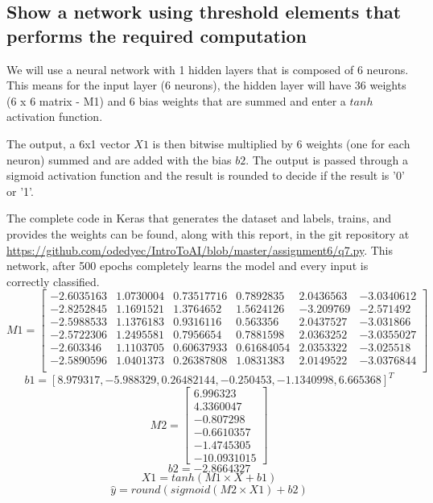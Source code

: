 \documentclass{article}                     %
\begin{document}
	\subsection{Show a network using threshold elements that performs the required computation}
	We will use a neural network with 1 hidden layers that is composed of 6 neurons. This means for the input layer (6 neurons), the hidden layer will have 36 weights (6 x 6 matrix - M1) and 6 bias weights that are summed and enter a $ tanh $ activation function. 
	
	The output, a 6x1 vector $ X1 $ is then bitwise multiplied by 6 weights (one for each neuron) summed and are added with the bias $ b2 $. The output is passed through a sigmoid activation function and the result is rounded to decide if the result is '0' or '1'.
	
	The complete code in Keras that generates the dataset and labels, trains, and provides the weights can be found, along with this report, in the git repository at \url{https://github.com/odedyec/IntroToAI/blob/master/assignment6/q7.py}. This network, after 500 epochs completely learns the model and every input is correctly classified.
	\begin{equation}\label{eq:m1}
	M1 = \left[ \begin{array}{cccccc}
		-2.6035163 & 1.0730004 & 0.73517716 &  0.7892835 & 2.0436563 & -3.0340612 \\
		-2.8252845 & 1.1691521 & 1.3764652 & 1.5624126 & -3.209769 &	-2.571492  \\
		-2.5988533 & 1.1376183 & 0.9316116 & 0.563356  & 2.0437527 & -3.031866  \\
		-2.5722306 & 1.2495581 & 0.7956654 & 0.7881598 & 2.0363252 &	-3.0355027 \\
		-2.603346  & 1.1103705 & 0.60637933 & 0.61684054 & 2.0353322 & -3.025518 \\
		-2.5890596 & 1.0401373 & 0.26387808 & 1.0831383 & 2.0149522 &  -3.0376844 \\
	\end{array} \right]
	\end{equation}
	\begin{equation}\label{eq:b1}
	b1 = \left[8.979317  , -5.988329  ,  0.26482144, -0.250453  , -1.1340998 ,
	6.665368 \right]^T
	\end{equation}
	\begin{equation}\label{eq:m2}
	M2 = \left[\begin{array}{c}
	6.996323 \\
	  4.3360047\\
	 -0.807298\\
	 -0.6610357\\
	 -1.4745305\\
	-10.0931015
	\end{array}\right]
	\end{equation}
	\begin{equation}\label{eq:b2}
	b2 = -2.8664327
	\end{equation}
	\begin{equation}\label{eq:l1}
	X1 = tanh(M1 \times X + b1)
	\end{equation}
	\begin{equation}\label{eq:l2}
	\hat{y} = round(sigmoid(M2 \times X1) + b2)
	\end{equation}
\end{document}

